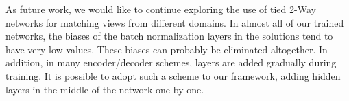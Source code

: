 \documentclass[10pt,twocolumn,letterpaper]{article}
\begin{document}
As future work, we would like to continue exploring the use of tied 2-Way networks for matching views from different domains. In almost all of our trained networks, the biases of the batch normalization layers in the solutions tend to have very low values. These biases can probably be eliminated altogether. In addition, in many encoder/decoder schemes, layers are added gradually during training. It is possible to adopt such a scheme to our framework, adding hidden layers in the middle of the network one by one.



\end{document}
